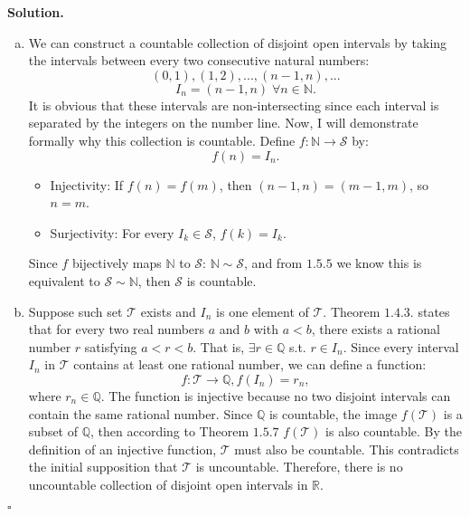 \documentclass[12pt]{article}
\theoremstyle{definition}
\theoremstyle{remark}
\newenvironment{solution}{
    \noindent
    \textbf{Solution.}\\
}{
    \quad \hfill $\square$
    \vspace{1em}
}
\begin{document}
\begin{solution}
    \begin{enumerate}[(a)] \item We can construct a countable collection of disjoint open intervals by taking the intervals between every two consecutive natural numbers: $$(0, 1), (1, 2), ..., (n-1, n), ...$$
    $$I_n = (n-1, n) \; \forall n \in \mathbb{N}.$$
    It is obvious that these intervals are non-intersecting since each interval is separated by the integers on the number line. Now, I will demonstrate formally why this collection is countable. Define \(f: \mathbb{N} \to \mathcal{S}\) by:
    \[
    f(n) = I_n.
    \]
    \begin{itemize}
        \item Injectivity: If \(f(n) = f(m)\), then \((n-1, n) = (m-1, m)\), so \(n = m\).
        \item Surjectivity: For every \(I_k \in \mathcal{S}\), \(f(k) = I_k\).
    \end{itemize}
    Since \(f\) bijectively maps \(\mathbb{N}\) to \(\mathcal{S}\): $\mathbb{N} \sim \mathcal{S} $, and from $1.5.5$ we know this is equivalent to $\mathcal{S} \sim \mathbb{N}$, then \(\mathcal{S}\) is countable.

    \item Suppose such set $\mathcal{T}$ exists and $I_n$ is one element of $\mathcal{T}$. Theorem $1.4.3.$ \cite{abbott2015understanding} states that for every two real numbers $a$ and $b$ with $a < b$, there exists a rational number $r$ satisfying $a < r < b$. That is, $\exists r \in \mathbb{Q}$ s.t. $r \in I_n$. Since every interval $I_n$ in $\mathcal{T}$ contains at least one rational number, we can define a function:
    $$f: \mathcal{T}\rightarrow{\mathbb{Q}}, f(I_n)=r_n,$$ where $r_n \in \mathbb{Q}$. The function is injective because no two disjoint intervals can contain the same rational number. Since $\mathbb{Q}$ is countable, the image $f(\mathcal{T})$ is a subset of $\mathbb{Q}$, then according to Theorem $1.5.7$ \cite{abbott2015understanding} $f(\mathcal{T})$ is also countable. By the definition of an injective function, $\mathcal{T}$ must also be countable. This contradicts the initial supposition that $\mathcal{T}$ is uncountable. Therefore, there is no uncountable collection of disjoint open intervals in $\mathbb{R}$.

\end{enumerate}
\end{solution}
\end{document}

